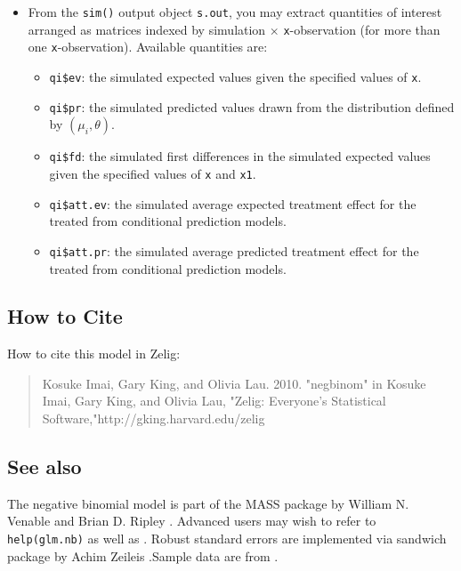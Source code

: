 \documentclass{article}
\begin{document}
\begin{itemize}
\item From the {\tt sim()} output object {\tt s.out}, you may extract
  quantities of interest arranged as matrices indexed by simulation
  $\times$ {\tt x}-observation (for more than one {\tt x}-observation).
  Available quantities are:

   \begin{itemize}
   \item {\tt qi\$ev}: the simulated expected values given the specified
     values of {\tt x}.
   \item {\tt qi\$pr}: the simulated predicted values drawn from the
     distribution defined by $(\mu_i, \theta)$.  
   \item {\tt qi\$fd}: the simulated first differences in the
     simulated expected values given the specified values of {\tt x}
     and {\tt x1}.
   \item {\tt qi\$att.ev}: the simulated average expected treatment
     effect for the treated from conditional prediction models.  
   \item {\tt qi\$att.pr}: the simulated average predicted treatment
     effect for the treated from conditional prediction models.  
   \end{itemize}
\end{itemize}

\subsection* {How to Cite} 

How to cite this model in Zelig:
\begin{verse}
  Kosuke Imai, Gary King, and Olivia Lau. 2010. "negbinom" in Kosuke Imai, Gary King, and Olivia Lau, "Zelig: Everyone's Statistical Software,"http://gking.harvard.edu/zelig
\end{verse}

\CiteZelig

\subsection* {See also}
The negative binomial model is part of the MASS package by William N. Venable and Brian D. Ripley \citep{VenRip02}. Advanced users may wish to refer to \texttt{help(glm.nb)} as well as \cite{McCNel89}. Robust standard errors are implemented via sandwich package by Achim Zeileis \citep{Zeileis04}.Sample data are from \cite{Martin92}.



 
\end{document}
